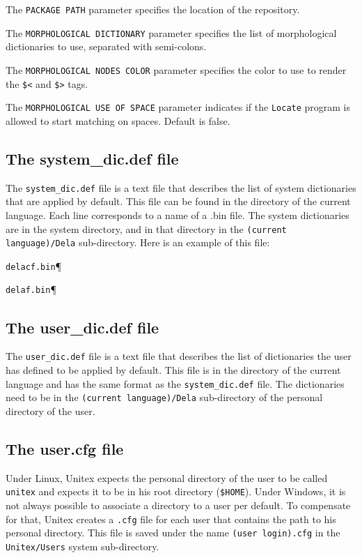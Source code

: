 \bigskip
\noindent The \verb+PACKAGE PATH+ parameter specifies the location of the
repository.

\bigskip
\noindent The \verb+MORPHOLOGICAL DICTIONARY+ parameter specifies the list of
morphological dictionaries to use, separated with semi-colons.

\bigskip
\noindent The \verb+MORPHOLOGICAL NODES COLOR+ parameter specifies the color
to use to render the \verb+$<+ and \verb+$>+ tags. 

\bigskip
\noindent The \verb+MORPHOLOGICAL USE OF SPACE+ parameter indicates if the
\verb+Locate+ program is allowed to start matching on spaces. Default is false. 


\subsection{The system\_dic.def file}
The \verb+system_dic.def+ file is a text file that describes the list of system
dictionaries that are applied by default. This file can be found in the directory
of the current language. Each line corresponds to a name of a .bin file. The
system dictionaries are in the system directory, and in that directory in the
\verb+(current language)/Dela+ sub-directory.  Here is an
example of this file:


\bigskip
\verb$delacf.bin$\P

\verb$delaf.bin$\P

\subsection{The user\_dic.def file}
The \verb+user_dic.def+ file is a text file that describes the list of
dictionaries the user has defined to be applied by default. This file is in the
directory of the current language and has the same format as the
\verb+system_dic.def+ file. 
The dictionaries need to be in the \verb+(current language)/Dela+ sub-directory of the personal directory of the user.

\subsection{The user.cfg file}
Under Linux, Unitex expects the personal directory of the user to be called
\verb+unitex+ and expects it to be in his root directory (\verb+$HOME+). Under
Windows, it is not always possible to associate a directory to a user per
default. To compensate for that, Unitex creates a \verb+.cfg+ file for each user
that contains the path to his personal directory. This file is saved under the
name \verb+(user login).cfg+ in the \verb+Unitex/Users+ system sub-directory.

